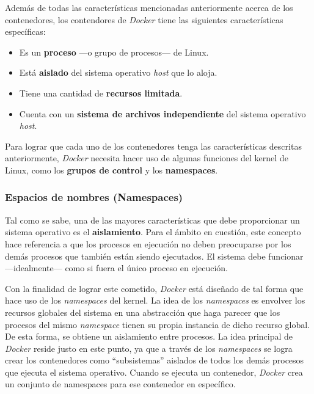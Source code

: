 \documentclass[12pt, letterpaper]{article}
\begin{document}
Además de todas las características mencionadas anteriormente acerca de los 
contenedores, los contendores de \textit{Docker} tiene las siguientes 
características específicas:
\begin{itemize}
  \item Es un \textbf{proceso} ---o grupo de procesos--- de Linux.
  \item Está \textbf{aislado} del sistema operativo \textit{host} que lo 
  aloja.
  \item Tiene una cantidad de \textbf{recursos limitada}.
  \item Cuenta con un \textbf{sistema de archivos independiente} del sistema 
  operativo \textit{host}.
\end{itemize}

Para lograr que cada uno de los contenedores tenga las características 
descritas anteriormente, \textit{Docker} necesita hacer uso de algunas 
funciones del kernel de Linux, como los \textbf{grupos de control} y los 
\textbf{namespaces}.

\subsubsection{Espacios de nombres (Namespaces)}
Tal como se sabe, una de las mayores características que debe proporcionar un 
sistema operativo es el \textbf{aislamiento}. Para el ámbito en cuestión, este 
concepto hace referencia a que los procesos en ejecución no deben preocuparse 
por los demás procesos que también están siendo ejecutados. El sistema debe 
funcionar ---idealmente--- como si fuera el único proceso en ejecución.

Con la finalidad de lograr este cometido, \textit{Docker} está diseñado de tal 
forma que hace uso de los \textit{namespaces} del kernel. La idea de los 
\textit{namespaces} es envolver los recursos globales del sistema en una 
abstracción que haga parecer que los procesos del mismo \textit{namespace} 
tienen su propia instancia de dicho recurso global. De esta forma, se obtiene 
un aislamiento entre procesos.  La idea principal de \textit{Docker} reside 
justo en este punto, ya que a través de los \textit{namespaces} se logra crear 
los contenedores como ``subsistemas'' aislados de todos los demás procesos que 
ejecuta el sistema operativo. Cuando se ejecuta un contenedor, \textit{Docker} 
crea un conjunto de namespaces para ese contenedor en específico.
\end{document}
